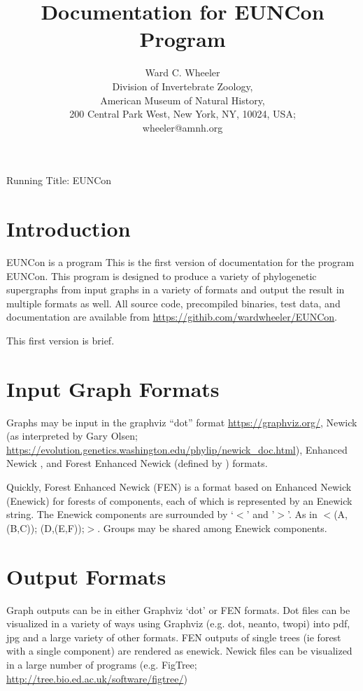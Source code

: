\documentclass[11pt]{memoir}
\begin{document}
	
	\title{Documentation for EUNCon Program}
	\author{Ward C. Wheeler\\
		Division of Invertebrate Zoology,\\ American Museum of Natural History,\\ 200 Central Park West, New York, NY, 10024, USA;\\wheeler@amnh.org}
	
	
	\maketitle
	\begin{center}
		Running Title: EUNCon
	\end{center}
	\newpage
	
	
	\section{Introduction}
	EUNCon is a program 
	This is the first version of documentation for the program EUNCon.  This program is designed to produce a variety of 
	phylogenetic supergraphs from input graphs in a variety of formats and output the result in multiple formats as well.
	All source code, precompiled binaries, test data, and documentation are available from \url{https://githib.com/wardwheeler/EUNCon}.
	
	This first version is brief.
	
	\section{Input Graph Formats}
	Graphs may be input in the graphviz ``dot'' format \url{https://graphviz.org/}, Newick (as interpreted by Gary Olsen; \url{https://evolution.genetics.washington.edu/phylip/newick_doc.html}), Enhanced Newick \cite{Cardonaetal2008},
	and Forest Enhanced Newick (defined by \citealp{WheelerPhyloSuperGraphs}) formats.
	
	Quickly, Forest Enhanced Newick (FEN) is a format based on Enhanced Newick (Enewick) for forests of components, each
	of which is represented by an Enewick string.  The Enewick components are surrounded by `$<$' and '$>$'.
	As in $<$(A, (B,C)); (D,(E,F));$>$.  Groups may be shared among Enewick components.
	
	\section{Output Formats}
	Graph outputs can be in either Graphviz `dot' or FEN formats.  Dot files can be visualized in a variety of ways 
	using Graphviz (e.g. dot, neanto, twopi) into pdf, jpg and a large variety of other formats. FEN outputs of 
	single trees (ie forest with a single component) are rendered as enewick.  Newick files can be visualized in a 
	large number of programs (e.g. FigTree; \url{http://tree.bio.ed.ac.uk/software/figtree/})
	
\end{document}
